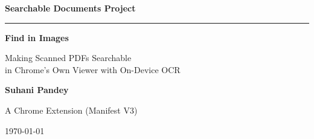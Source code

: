 \documentclass[11pt,a4paper]{article}
\begin{document}
\begin{titlepage}
  \centering
  \vspace*{1.5cm}

  {\Large\bfseries\color{accent} Searchable Documents Project\par}
  \vspace{0.4cm}
  {\color{rulegray}\rule{0.6\textwidth}{1pt}}\par
  \vspace{1.2cm}

  {\Huge\bfseries Find in Images\par}
  \vspace{0.8cm}
  {\LARGE Making Scanned PDFs Searchable\\[0.3em]
   in Chrome's Own Viewer with On-Device OCR\par}

  \vspace{2.2cm}
  {\large\bfseries Suhani Pandey\par}
  \vspace{0.3cm}
  {\normalsize A Chrome Extension (Manifest V3)\par}

  \vfill


  \vspace{1.2cm}
  {\large \today\par}
\end{titlepage}

\tableofcontents
\thispagestyle{fancy}
\clearpage













\clearpage
{}


\end{document}
